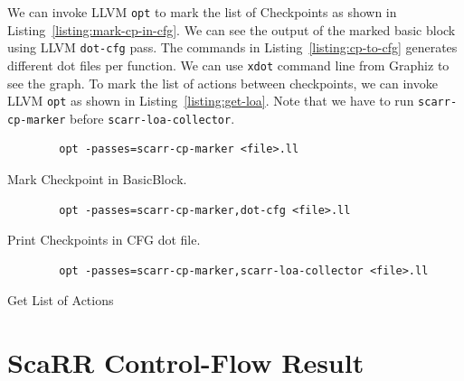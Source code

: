 We can invoke LLVM \texttt{opt} to mark the list of Checkpoints as shown in
Listing~\ref{listing:mark-cp-in-cfg}. We can see the output of the marked basic
block using LLVM \texttt{dot-cfg} pass. The commands in
Listing~\ref{listing:cp-to-cfg} generates different dot files per function. We
can use \texttt{xdot} command line from Graphiz to see the graph. To mark the
list of actions between checkpoints, we can invoke LLVM \texttt{opt} as shown in
Listing~\ref{listing:get-loa}. Note that we have to run \texttt{scarr-cp-marker}
before \texttt{scarr-loa-collector}.

\begin{listing}[ht]
    \begin{verbatim}
        opt -passes=scarr-cp-marker <file>.ll
    \end{verbatim}
    \caption{Mark Checkpoint in BasicBlock.}    
    \label{listing:mark-cp-in-cfg}
\end{listing}


\begin{listing}[ht]
    \begin{verbatim}
        opt -passes=scarr-cp-marker,dot-cfg <file>.ll
    \end{verbatim}
    \caption{Print Checkpoints in CFG dot file.}    
    \label{listing:cp-to-cfg}
\end{listing}


\begin{listing}[ht]
    \begin{verbatim}
        opt -passes=scarr-cp-marker,scarr-loa-collector <file>.ll
    \end{verbatim}
    \caption{Get List of Actions}    
    \label{listing:get-loa}
\end{listing}


\section{ScaRR Control-Flow Result}

